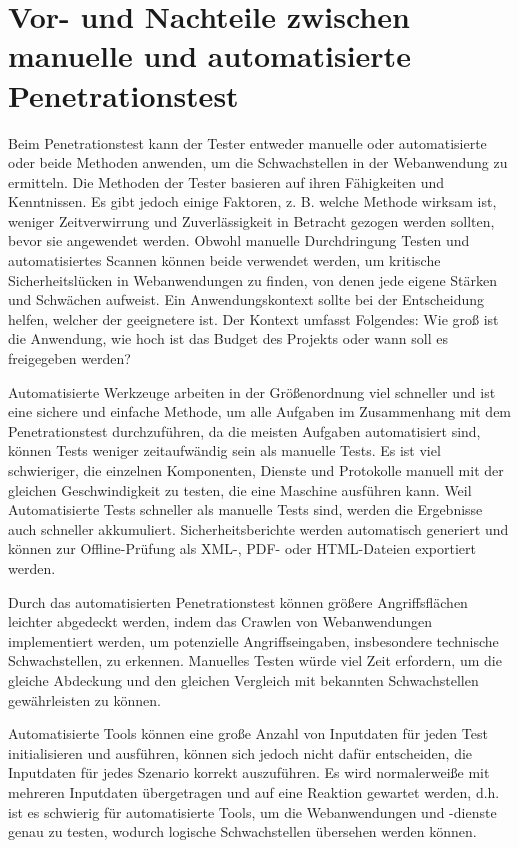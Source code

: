 \section{Vor- und Nachteile zwischen manuelle und automatisierte Penetrationstest}

Beim Penetrationstest kann der Tester entweder manuelle oder automatisierte oder beide Methoden anwenden, um die Schwachstellen in der Webanwendung zu ermitteln. Die Methoden der Tester basieren auf ihren Fähigkeiten und Kenntnissen. Es gibt jedoch einige Faktoren, z. B. welche Methode wirksam ist, weniger Zeitverwirrung und Zuverlässigkeit in Betracht gezogen werden sollten, bevor sie angewendet werden. Obwohl manuelle Durchdringung Testen und automatisiertes Scannen können beide verwendet werden, um kritische Sicherheitslücken in Webanwendungen zu finden, von denen jede eigene Stärken und Schwächen aufweist. Ein Anwendungskontext sollte bei der Entscheidung helfen, welcher der geeignetere ist. Der Kontext umfasst Folgendes: Wie groß ist die Anwendung, wie hoch ist das Budget des Projekts oder wann soll es freigegeben werden? 

Automatisierte Werkzeuge arbeiten in der Größenordnung viel schneller und ist eine sichere und einfache Methode, um alle Aufgaben im Zusammenhang mit dem Penetrationstest durchzuführen, da die meisten Aufgaben automatisiert sind, können Tests weniger zeitaufwändig sein als manuelle Tests. Es ist viel schwieriger, die einzelnen Komponenten, Dienste und Protokolle manuell mit der gleichen Geschwindigkeit zu testen, die eine Maschine ausführen kann. Weil Automatisierte Tests schneller als manuelle Tests sind, werden die Ergebnisse auch schneller akkumuliert. Sicherheitsberichte werden automatisch generiert und können zur Offline-Prüfung als XML-, PDF- oder HTML-Dateien exportiert werden\cite{autovorteil99}.

Durch das automatisierten Penetrationstest können größere Angriffsflächen leichter abgedeckt werden, indem das Crawlen von Webanwendungen implementiert werden, um potenzielle Angriffseingaben, insbesondere technische Schwachstellen, zu erkennen. Manuelles Testen würde viel Zeit erfordern, um die gleiche Abdeckung und den gleichen Vergleich mit bekannten Schwachstellen gewährleisten zu können\cite{packetlabs18}.

Automatisierte Tools können eine große Anzahl von Inputdaten für jeden Test initialisieren und ausführen, können sich jedoch nicht dafür entscheiden, die Inputdaten für jedes Szenario korrekt auszuführen. Es wird normalerweiße mit mehreren Inputdaten übergetragen und auf eine Reaktion gewartet werden, d.h. ist es schwierig für automatisierte Tools, um die Webanwendungen und -dienste genau zu testen, wodurch logische Schwachstellen übersehen werden können\cite{packetlabs18}.

